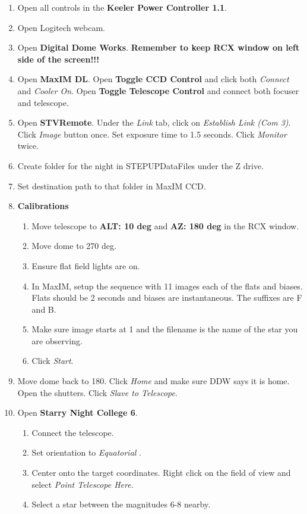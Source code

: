 \documentclass[11pt]{report}
\begin{document}
\begin{enumerate}
\item Open all controls in the {\bf Keeler Power Controller 1.1}.
\item Open Logitech webcam. 
\item Open {\bf Digital Dome Works}. {\bf Remember to keep RCX window on left side of the screen!!!}
\item Open {\bf MaxIM DL}. Open {\bf Toggle CCD Control} and click both \emph{Connect} and \emph{Cooler On}. Open {\bf Toggle Telescope Control} and connect both focuser and telescope.
\item Open {\bf STVRemote}. Under the \emph{Link} tab, click on \emph{Establish Link (Com 3)}. Click \emph{Image} button once. Set exposure time to 1.5 seconds. Click \emph{Monitor} twice. 
\item Create folder for the night in STEPUPDataFiles under the Z drive.
\item Set destination path to that folder in MaxIM CCD.
\item {\bf Calibrations}
\begin{enumerate}
\item Move telescope to {\bf ALT: 10 deg} and {\bf AZ: 180 deg} in the RCX window.
\item Move dome to 270 deg. 
\item Ensure flat field lights are on.
\item In MaxIM, setup the sequence with 11 images each of the flats and biases. Flats should be 2 seconds and biases are instantaneous. The suffixes are F and B. 
\item Make sure image starts at 1 and the filename is the name of the star you are observing. 
\item Click \emph{Start}.
\end{enumerate}
\item Move dome back to 180. Click \emph{Home} and make sure DDW says it is home. Open the shutters. Click \emph{Slave to Telescope}.
\item Open {\bf Starry Night College 6}. 
\begin{enumerate}
\item Connect the telescope. 
\item Set orientation to \emph{Equatorial} .
\item Center onto the target coordinates. Right click on the field of view and select \emph{Point Telescope Here}.
\item Select a star between the magnitudes 6-8 nearby. 

\end{enumerate}
\end{enumerate}
\end{document}
